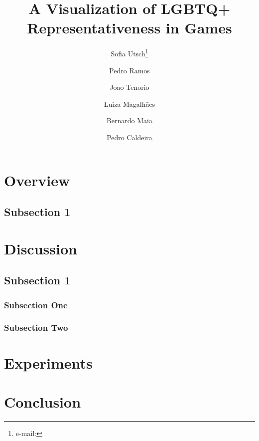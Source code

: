 \documentclass{vgtc}                          %
\title{A Visualization of LGBTQ+ Representativeness in Games}
\author{Sofia Utsch\thanks{e-mail: } %
\and Pedro Ramos %
\and Joao Tenorio
\and Luiza Magalhães
\and Bernardo Maia
\and Pedro Caldeira}
\affiliation{\scriptsize $^{}$Universidade Federal de Minas Gerais\\}
\begin{document}


\maketitle

\section{Overview}

\subsection{Subsection 1}

\section{Discussion}

\subsection{Subsection 1}

\subsubsection{Subsection One}

\subsubsection{Subsection Two}

\section{Experiments}

\section{Conclusion}



\end{document}

